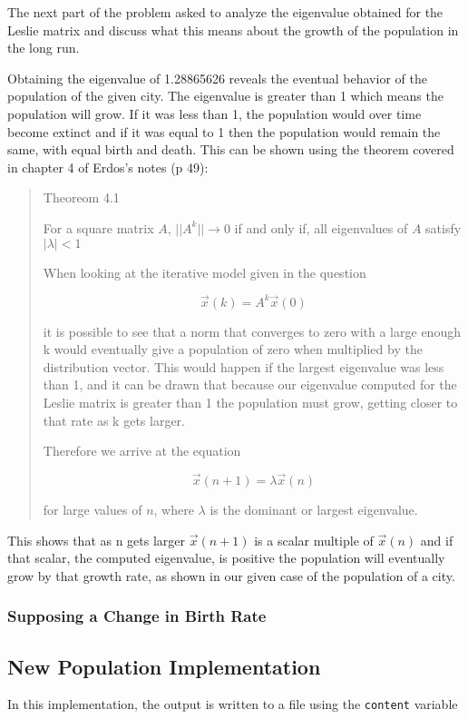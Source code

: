 \documentclass[letterpaper,12pt]{article}
\begin{document}
The next part of the problem asked to analyze the eigenvalue obtained for the
Leslie matrix and discuss what this means about the growth of the population in
the long run.

Obtaining the eigenvalue of 1.28865626 reveals the eventual behavior of the
population of the given city.
The eigenvalue is greater than 1 which means the population will grow.
If it was less than 1, the population would over time become extinct and if
it was equal to 1 then the population would remain the same, with equal birth and death.
This can be shown using the theorem covered in chapter 4 of Erdos's notes (p 49):

\begin{quote}
Theoreom 4.1

For a square matrix $A$,
$||A^k|| \to 0$ if and only if, all eigenvalues of $A$ satisfy $|\lambda| < 1$

When looking at the iterative model given in the question 

\[\vec{x}(k) = A^k \vec{x}(0)\]

it is possible to see that a norm that converges to zero with a large enough k would eventually give a population of zero when multiplied by the distribution vector.
This would happen if the largest eigenvalue was less than 1, and it can be drawn that because our eigenvalue computed for
the Leslie matrix is greater than 1 the population must grow, getting closer to that rate as k gets larger.

Therefore we arrive at the equation

\[\vec{x}(n+1) = \lambda\vec{x}(n)\]

for large values of $n$, where $\lambda$ is the dominant or largest eigenvalue.
\end{quote}

This shows that as n gets larger $\vec{x}(n+1)$ is a scalar multiple of $\vec{x}(n)$ and if that scalar,
the computed eigenvalue, is positive the population will eventually grow by that growth rate,
as shown in our given case of the population of a city.

\subsubsection{Supposing a Change in Birth Rate}

\subsection{New Population Implementation}
In this implementation, the output is written to a file using the \texttt{content} variable
\end{document}
